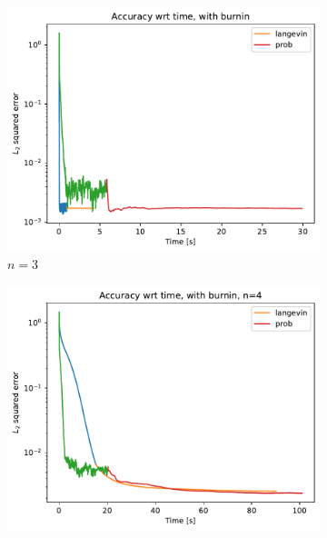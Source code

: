 \documentclass[12pt]{memoir}
\begin{document}
\begin{figure}[H]

    \centering

    \begin{subfigure}[b]{0.49\textwidth}


        \centering

        \includegraphics[width=\textwidth]{figures/experiments/baseline/diff_n_qubits/iters_acc_comp_time_no_avg-1.png}

        \caption{$n=3$}

        \label{fig:conv-plot-time-diff-n-3-sub}

    \end{subfigure}
    \hfill
    \begin{subfigure}[b]{0.49\textwidth}


        \centering

        \includegraphics[width=\textwidth]{figures/experiments/baseline/diff_n_qubits/iters_acc_comp_time_no_avg_n4-1.png}


\end{subfigure}
\end{figure}
\end{document}
